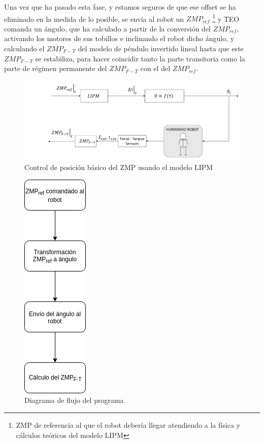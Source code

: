 \begin{enumerate}
Una vez que ha pasado esta fase, y estamos seguros de que ese offset se ha eliminado en la medida de lo posible, se envía al robot un $ZMP_{ref}$ \footnote{ZMP de referencia al que el robot debería llegar atendiendo a la física y cálculos teóricos del modelo LIPM} y TEO comanda un ángulo, que ha calculado a partir de la conversión del $ZMP_{ref}$, activando los motores de sus tobillos e inclinando el robot dicho ángulo, y calculando el $ZMP_{F-T}$ del modelo de péndulo invertido lineal hasta que este $ZMP_{F-T}$ se estabiliza, para hacer coincidir tanto la parte transitoria como la parte de régimen permanente del $ZMP_{F-T}$ con el del $ZMP_{ref}$.

\end{enumerate}

\begin{figure}[H]
\centering
\includegraphics[scale=2.2]{imagenes/apartado_5/5.1/51_esquema1}
\caption{Control de posición básico del ZMP usando el modelo LIPM}
\label{figura51}
\end{figure}

\begin{figure}[H]
\centering
\includegraphics[scale=0.5]{imagenes/apartado_5/5.1/52_diagrama_flujo1}
\caption{Diagrama de flujo del programa}
\label{figura52}
\end{figure}


